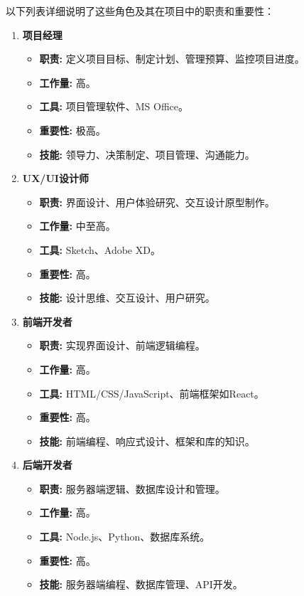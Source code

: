 \documentclass{ctexart}
\begin{document}
以下列表详细说明了这些角色及其在项目中的职责和重要性：
\begin{enumerate}
  \item \textbf{项目经理}
  \begin{itemize}
    \item \textbf{职责:} 定义项目目标、制定计划、管理预算、监控项目进度。
    \item \textbf{工作量:} 高。
    \item \textbf{工具:} 项目管理软件、MS Office。
    \item \textbf{重要性:} 极高。
    \item \textbf{技能:} 领导力、决策制定、项目管理、沟通能力。
  \end{itemize}

  \item \textbf{UX/UI设计师}
  \begin{itemize}
    \item \textbf{职责:} 界面设计、用户体验研究、交互设计原型制作。
    \item \textbf{工作量:} 中至高。
    \item \textbf{工具:} Sketch、Adobe XD。
    \item \textbf{重要性:} 高。
    \item \textbf{技能:} 设计思维、交互设计、用户研究。
  \end{itemize}

  \item \textbf{前端开发者}
  \begin{itemize}
    \item \textbf{职责:} 实现界面设计、前端逻辑编程。
    \item \textbf{工作量:} 高。
    \item \textbf{工具:} HTML/CSS/JavaScript、前端框架如React。
    \item \textbf{重要性:} 高。
    \item \textbf{技能:} 前端编程、响应式设计、框架和库的知识。
  \end{itemize}

  \item \textbf{后端开发者}
  \begin{itemize}
    \item \textbf{职责:} 服务器端逻辑、数据库设计和管理。
    \item \textbf{工作量:} 高。
    \item \textbf{工具:} Node.js、Python、数据库系统。
    \item \textbf{重要性:} 高。
    \item \textbf{技能:} 服务器端编程、数据库管理、API开发。
  \end{itemize}


\end{enumerate}
\end{document}
